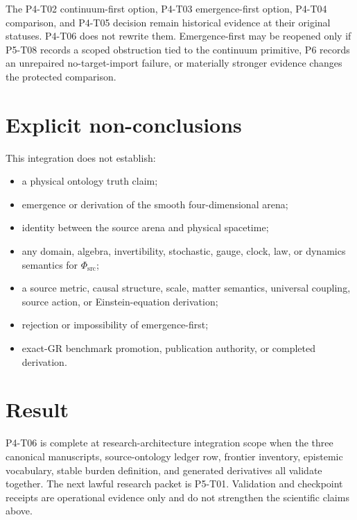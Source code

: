 \documentclass[11pt]{article}
\newcommand{\PhiSrc}{\Phi_{\mathrm{src}}}
\begin{document}
The P4-T02 continuum-first option, P4-T03 emergence-first option, P4-T04
comparison, and P4-T05 decision remain historical evidence at their original
statuses. P4-T06 does not rewrite them. Emergence-first may be reopened only
if P5-T08 records a scoped obstruction tied to the continuum primitive, P6
records an unrepaired no-target-import failure, or materially stronger
evidence changes the protected comparison.

\section{Explicit non-conclusions}

This integration does not establish:
\begin{itemize}
  \item a physical ontology truth claim;
  \item emergence or derivation of the smooth four-dimensional arena;
  \item identity between the source arena and physical spacetime;
  \item any domain, algebra, invertibility, stochastic, gauge, clock, law, or
  dynamics semantics for \(\PhiSrc\);
  \item a source metric, causal structure, scale, matter semantics, universal
  coupling, source action, or Einstein-equation derivation;
  \item rejection or impossibility of emergence-first;
  \item exact-GR benchmark promotion, publication authority, or completed
  derivation.
\end{itemize}

\section{Result}

P4-T06 is complete at research-architecture integration scope when the three
canonical manuscripts, source-ontology ledger row, frontier inventory,
epistemic vocabulary, stable burden definition, and generated derivatives all
validate together. The next lawful research packet is P5-T01. Validation and
checkpoint receipts are operational evidence only and do not strengthen the
scientific claims above.
\end{document}
